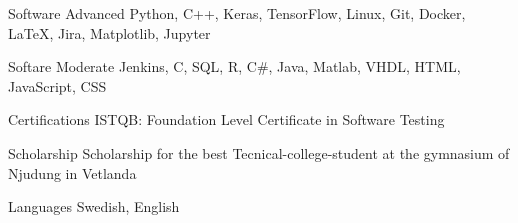 

\begin{cvskills}

  \cvskill
    {Software Advanced} %
    {Python, C++, Keras, TensorFlow, Linux, Git, Docker, LaTeX, Jira, Matplotlib, Jupyter} %

  \cvskill
    {Softare Moderate} %
    {Jenkins, C, SQL, R, C\#, Java, Matlab, VHDL, HTML, JavaScript, CSS} %

  \cvskill
  {Certifications} %
  {ISTQB: Foundation Level Certificate in Software Testing} %

  \cvskill
    {Scholarship} %
    {Scholarship for the best Tecnical-college-student at the
    gymnasium of Njudung in Vetlanda} %

  \cvskill
    {Languages} %
    {Swedish, English} %

\end{cvskills}
